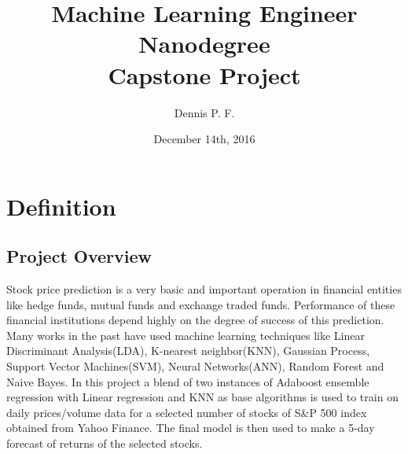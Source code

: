 \documentclass[10pt]{report}
\begin{document}
\title{%
  Machine Learning Engineer Nanodegree \\
  \large Capstone Project}
\author{Dennis P. F.}
\date{December 14th, 2016}
\maketitle

\section{Definition}
\subsection*{Project Overview}
Stock price prediction is a very basic and important operation in financial entities like hedge funds, mutual funds and exchange traded funds. Performance of these financial institutions depend highly on the degree of success of this prediction. Many works in the past have used machine learning techniques like Linear Discriminant Analysis(LDA), K-nearest neighbor(KNN), Gaussian Process, Support Vector Machines(SVM), Neural Networks(ANN), Random Forest and Naive Bayes\cite{Ou2009}\cite{Patel2015}. In this project a blend of two instances of Adaboost ensemble regression with Linear regression and KNN as base algorithms is used to train on daily prices/volume data for a selected number of stocks of S\&P 500\cite{sp500} index obtained from Yahoo Finance. The final model is then used to make a 5-day forecast of returns of the selected stocks.
\end{document}
